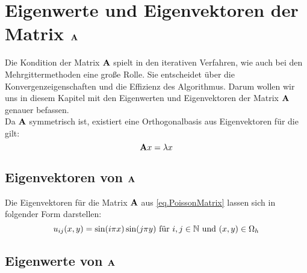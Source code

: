 


\section{Eigenwerte und Eigenvektoren der Matrix ${\textbf{A}}$}\label{s.Eigenwerte und Eigenvektoren}

Die Kondition der Matrix ${\textbf{A}}$ spielt in den iterativen Verfahren, wie auch bei den Mehrgittermethoden eine große Rolle. Sie entscheidet über die Konvergenzeigenschaften und die Effizienz des Algorithmus. Darum wollen wir uns in diesem Kapitel mit den Eigenwerten und Eigenvektoren der Matrix ${\textbf{A}}$ genauer befassen. \\
Da ${\textbf{A}}$ symmetrisch ist, existiert eine Orthogonalbasis aus Eigenvektoren für die gilt:
\begin{equation}
{\textbf{A}}x = \lambda x
\end{equation}

\subsection{Eigenvektoren von ${\textbf{A}}$}\label{ss.Eigenvektoren}

Die Eigenvektoren für die Matrix ${\textbf{A}}$ aus \autoref{eq.PoissonMatrix} lassen sich in folgender Form darstellen:
\begin{equation}
u_{ij}(x,y) = \sin(i \pi x) \sin(j \pi y) \textnormal{ für } i,j \in \mathbb{N} \textnormal{ und } (x,y) \in \Omega_{h}
\end{equation}

\subsection{Eigenwerte von ${\textbf{A}}$}\label{ss.Eigenwerte}

